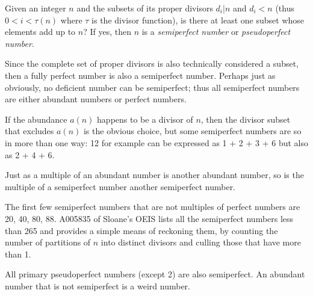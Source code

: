 \documentclass[12pt]{article}
\begin{document}
Given an integer $n$ and the subsets of its proper divisors $d_i|n$ and $d_i < n$ (thus $0 < i < \tau(n)$ where $\tau$ is the divisor function), is there at least one subset whose elements add up to $n$? If yes, then $n$ is a \emph{semiperfect number} or \emph{pseudoperfect number}.

Since the complete set of proper divisors is also technically considered a subset, then a fully perfect number is also a semiperfect number. Perhaps just as obviously, no deficient number can be semiperfect; thus all semiperfect numbers are either abundant numbers or perfect numbers.

If the abundance $a(n)$ happens to be a divisor of $n$, then the divisor subset that excludes $a(n)$ is the obvious choice, but some semiperfect numbers are so in more than one way: 12 for example can be expressed as 1 + 2 + 3 + 6 but also as 2 + 4 + 6.

Just as a multiple of an abundant number is another abundant number, so is the multiple of a semiperfect number another semiperfect number.

The first few semiperfect numbers that are not multiples of perfect numbers are 20, 40, 80,  88. A005835 of Sloane's OEIS lists all the semiperfect numbers less than 265 and provides a simple means of reckoning them, by counting the number of partitions of $n$ into distinct divisors and culling those that have more than 1.

All primary pseudoperfect numbers (except 2) are also semiperfect. An abundant number that is not semiperfect is a weird number.
\end{document}
